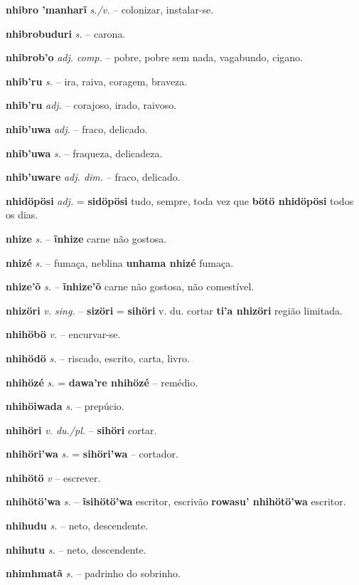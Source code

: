 \textbf{nhibro 'manharĩ} \textit{s./v.} -- colonizar, instalar-se.

\textbf{nhibrobuduri} \textit{s.} -- carona.

\textbf{nhibrob'o} \textit{adj. comp.} -- pobre, pobre sem nada, vagabundo, cigano.

\textbf{nhib'ru} \textit{s.} -- ira, raiva, coragem, braveza.

\textbf{nhib'ru} \textit{adj.} -- corajoso, irado, raivoso.

\textbf{nhib'uwa} \textit{adj.} -- fraco, delicado.

\textbf{nhib'uwa} \textit{s.} -- fraqueza, delicadeza.

\textbf{nhib'uware} \textit{adj. dim.} -- fraco, delicado.

\textbf{nhidöpösi} \textit{adj.} = \textbf{sidöpösi} tudo, sempre, toda vez que  \textbf{bötö nhidöpösi} todos os dias.

\textbf{nhize} \textit{s.} -- \textbf{ĩnhize} carne não gostosa.

\textbf{nhizé} \textit{s.} -- fumaça, neblina  \textbf{unhama nhizé} fumaça.

\textbf{nhize'õ} \textit{s.} -- \textbf{ĩnhize'õ} carne não gostosa, não comestível.

\textbf{nhizöri} \textit{v. sing.} -- \textbf{sizöri} = \textbf{sihöri} v. du. cortar  \textbf{ti'a nhizöri} região limitada.

\textbf{nhihöbö} \textit{v.} -- encurvar-se.

\textbf{nhihödö} \textit{s.} -- riscado, escrito, carta, livro.

\textbf{nhihözé} \textit{s.} = \textbf{dawa're nhihözé} -- remédio.

\textbf{nhihöiwada} \textit{s.} -- prepúcio.

\textbf{nhihöri} \textit{v. du./pl.} -- \textbf{sihöri} cortar.

\textbf{nhihöri'wa} \textit{s.} = \textbf{sihöri'wa} -- cortador.

\textbf{nhihötö} \textit{v} -- escrever.

\textbf{nhihötö'wa} \textit{s.} -- \textbf{ĩsihötö'wa} escritor, escrivão  \textbf{rowasu' nhihötö'wa} escritor.

\textbf{nhihudu} \textit{s.} -- neto, descendente.

\textbf{nhihutu} \textit{s.} -- neto, descendente.

\textbf{nhimhmatã} \textit{s.} -- padrinho do sobrinho.

